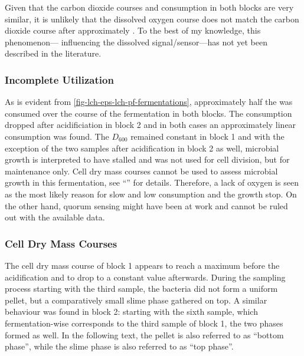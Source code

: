 Given that the carbon dioxide courses and \glc{} consumption in both blocks are very similar, it is unlikely that the dissolved oxygen course does not match the carbon dioxide course after approximately . To the best of my knowledge, this phenomenon---\lch{} influencing the dissolved signal/sensor---has not yet been described in the literature.

\subsubsection{Incomplete \GLC{} Utilization}
As is evident from \vref{fig-lch-eps-lch-pf-fermentations}, approximately half the \glc{} was consumed over the course of the fermentation in both blocks. The consumption dropped after acidificiation in block 2 and in both cases an approximately linear consumption was found. The $D_{600}$ remained constant in block 1 and with the exception of the two samples after acidification in block 2 as well, microbial growth is interpreted to have stalled and \glc{} was not used for cell division, but for maintenance only. Cell dry mass courses cannot be used to assess microbial growth in this fermentation, see \enquote{}  for details. Therefore, a lack of oxygen is seen as the most likely reason for slow and low \glc{} consumption and the growth stop. On the other hand, quorum sensing might have been at work \cite{Parsek2005} and cannot be ruled out with the available data.

\subsubsection{Cell Dry Mass Courses\label{subsubsec-lch-eps-disc-lch-pf-cdm}}
The cell dry mass course of block 1 appears to reach a maximum before the acidification and to drop to a constant value afterwards. During the sampling process starting with the third sample, the bacteria did not form a uniform pellet, but a comparatively small slime phase gathered on top. A similar behaviour was found in block 2: starting with the sixth sample, which fermentation-wise corresponds to the third sample of block 1, the two phases formed as well. In the following text, the pellet is also referred to as \enquote{bottom phase}, while the slime phase is also referred to as \enquote{top phase}.

